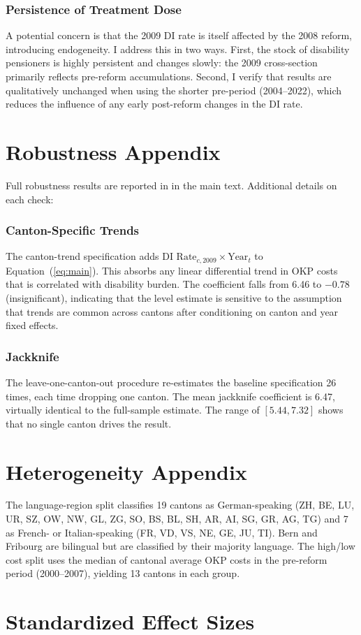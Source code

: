 \documentclass[12pt]{article}
\begin{document}
\subsubsection*{Persistence of Treatment Dose} A potential concern is that the 2009 DI rate is itself affected by the 2008 reform, introducing endogeneity. I address this in two ways. First, the stock of disability pensioners is highly persistent and changes slowly: the 2009 cross-section primarily reflects pre-reform accumulations. Second, I verify that results are qualitatively unchanged when using the shorter pre-period (2004--2022), which reduces the influence of any early post-reform changes in the DI rate.

\section{Robustness Appendix}
\label{app:robustness}

Full robustness results are reported in  in the main text. Additional details on each check:

\subsubsection*{Canton-Specific Trends} The canton-trend specification adds $\text{DI Rate}_{c,2009} \times \text{Year}_t$ to Equation~(\ref{eq:main}). This absorbs any linear differential trend in OKP costs that is correlated with disability burden. The coefficient falls from 6.46 to $-0.78$ (insignificant), indicating that the level estimate is sensitive to the assumption that trends are common across cantons after conditioning on canton and year fixed effects.

\subsubsection*{Jackknife} The leave-one-canton-out procedure re-estimates the baseline specification 26 times, each time dropping one canton. The mean jackknife coefficient is 6.47, virtually identical to the full-sample estimate. The range of $[5.44, 7.32]$ shows that no single canton drives the result.

\section{Heterogeneity Appendix}
\label{app:heterogeneity}

The language-region split classifies 19 cantons as German-speaking (ZH, BE, LU, UR, SZ, OW, NW, GL, ZG, SO, BS, BL, SH, AR, AI, SG, GR, AG, TG) and 7 as French- or Italian-speaking (FR, VD, VS, NE, GE, JU, TI). Bern and Fribourg are bilingual but are classified by their majority language. The high/low cost split uses the median of cantonal average OKP costs in the pre-reform period (2000--2007), yielding 13 cantons in each group.

\section{Standardized Effect Sizes}
\label{sec:sde}


\end{document}
